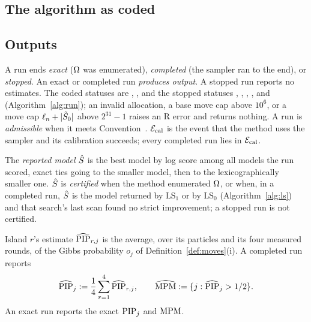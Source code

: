 \subsection{The algorithm as coded}\label{sec:algorithm}


\subsection{Outputs}\label{sec:outputs-method}

\begin{definition}\label{def:outcomes}
A run ends \emph{exact} ($\Omega$ was enumerated), \emph{completed} (the sampler ran to the end), or \emph{stopped}. An
exact or completed run \emph{produces output}. A stopped run reports no estimates. The coded statuses are ,
, and the stopped statuses , , ,
,  and  (Algorithm~\ref{alg:run}); an invalid
allocation, a base move cap above $10^6$, or a move cap $\ell_n+\lvert \tilde S_0\rvert$ above $2^{31}-1$ raises an R error and returns nothing. A run is \emph{admissible} when it meets
Convention~. $\mathcal E_{\mathrm{cal}}$ is the event that the method uses the sampler and its calibration succeeds; every completed
run lies in $\mathcal E_{\mathrm{cal}}$.
\end{definition}

\begin{definition}\label{def:shat}
The \emph{reported model} $\hat S$ is the best model by log score among all models the run scored, exact ties going to the
smaller model, then to the lexicographically smaller one. $\hat S$ is \emph{certified} when the method enumerated $\Omega$, or
when, in a completed run, $\hat S$ is the model returned by $\mathrm{LS}_1$ or by $\mathrm{LS}_0$ (Algorithm~\ref{alg:ls}) and that search's last scan found no
strict improvement; a stopped run is not certified.
\end{definition}

\begin{definition}\label{def:pipr}
Island $r$'s estimate $\widehat{\mathrm{PIP}}_{r,j}$ is the average, over its particles and its four measured rounds, of the Gibbs
probability $o_j$ of Definition~\ref{def:moves}(i). A completed run reports
\[
  \widehat{\mathrm{PIP}}_j:=\frac14\sum_{r=1}^4\widehat{\mathrm{PIP}}_{r,j},\qquad \widehat{\mathrm{MPM}}:=\{j:\widehat{\mathrm{PIP}}_j>1/2\}.
\]
An exact run reports the exact $\mathrm{PIP}_j$ and $\mathrm{MPM}$.
\end{definition}


